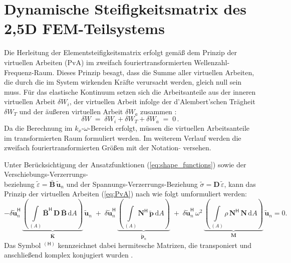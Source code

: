 \section{Dynamische Steifigkeitsmatrix des 2,5D FEM-Teilsystems}
\label{sec:twofiveD_FEM}

Die Herleitung der Elementsteifigkeitsmatrix erfolgt gemäß dem Prinzip der virtuellen Arbeiten (PvA) im zweifach fouriertransformierten Wellenzahl-Frequenz-Raum. Dieses Prinzip besagt, dass die Summe aller virtuellen Arbeiten, die durch die im System wirkenden Kräfte verursacht werden, gleich null sein muss.
Für das elastische Kontinuum setzen sich die Arbeitsanteile aus der inneren virtuellen Arbeit $\delta W_i$, der virtuellen Arbeit infolge der d'Alembert'schen Trägheit $\delta W_T$ und der äußeren virtuellen Arbeit $\delta W_a$ zusammen \citep{Klein2003}:
\begin{equation}\label{eq:PvA}
	\delta W \;=\; \delta W_i + \delta W_T + \delta W_a \;=\; 0 \,.
\end{equation}
Da die Berechnung im \(k_x\)-\(\omega\)-Bereich erfolgt, müssen die virtuellen Arbeitsanteile im transformierten Raum formuliert werden. 
Im weiterem Verlauf werden die zweifach fouriertransformierten Größen mit der Notation $\tilde{}$ versehen.

Unter Berücksichtigung der Ansatzfunktionen (\ref{eq:shape_functions}) sowie der Verschiebungs-Verzerrungs-\\beziehung $\tilde{\varepsilon}=\bar{\mathbf B}\,\tilde{\mathbf u}_{n}$ und der Spannungs-Verzerrungs-Beziehung $\tilde{\sigma} = \mathbf D\,\tilde{\varepsilon}$, kann das Prinzip der virtuellen Arbeiten (\ref{eq:PvA}) nach \cite{Freisinger2022} wie folgt umformuliert werden:
\begin{equation}\label{eq:PvA2}
	-\delta \tilde{\mathbf u}_{n}^{\mathsf H}\,
	\underbrace{\left(\int\limits_{(A)} \bar{\mathbf B}^{\mathsf H}\,\mathbf D\,\bar{\mathbf B}\,\mathrm dA\right)}_{\bar{\mathbf{K}}}\,
	\tilde{\mathbf u}_{n}
	\;+\;
	\delta \tilde{\mathbf u}_{n}^{\mathsf H}\,
	\underbrace{\left(\int\limits_{(A)} \mathbf N^{\mathsf H}\,\tilde{\mathbf p}\,\mathrm dA\right)}_{\tilde{\mathbf p}_{n}}
	\;+\;
	\delta \tilde{\mathbf u}_{n}^{\mathsf H}\,\omega^{2}\,
	\underbrace{\left(\int\limits_{(A)} \rho\,\mathbf N^{\mathsf H}\,\mathbf N\,\mathrm dA\right)}_{\mathbf M}\,
	\tilde{\mathbf u}_{n}
	= 0 .
\end{equation}
Das Symbol \(^{(\mathsf H)}\) kennzeichnet dabei hermitesche Matrizen, die transponiert und anschließend komplex konjugiert wurden \citep{Hackenberg2016}.

